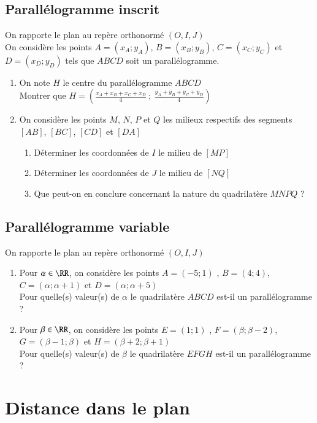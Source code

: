 \documentclass[oneside,12pt]{article}          %
\begin{document}
\subsection{Parallélogramme inscrit}
On rapporte le plan au repère orthonormé $(O,I,J)$\\
On considère les points $A=(x_A;y_A)$, $B=(x_B;y_B)$, $C=(x_C;y_C)$ et $D=(x_D;y_D)$ tels que $ABCD$ soit un parallélogramme.
\begin{enumerate}
	\item On note $H$ le centre du parallélogramme $ABCD$\\
	Montrer que $H=\left(\frac{x_A+x_B+x_C+x_D}{4}~;~\frac{y_A+y_B+y_C+y_D}{4}\right)$
	\item On considère les points $M$, $N$, $P$ et $Q$ les milieux respectifs des segments $[AB]$, $[BC]$, $[CD]$ et $[DA]$
	\begin{enumerate}
		\item Déterminer les coordonnées de $I$ le milieu de $[MP]$
		\item Déterminer les coordonnées de $J$ le milieu de $[NQ]$
		\item Que peut-on en conclure concernant la nature du quadrilatère $MNPQ$ ?
	\end{enumerate}
\end{enumerate}



\subsection{Parallélogramme variable}
On rapporte le plan au repère orthonormé $(O,I,J)$
\begin{enumerate}\setlength{\itemsep}{1pt}
	\item Pour $\alpha\in\RR$, on considère les points $A=(-5;1)$ , $B=(4;4)$, $C=(\alpha;\alpha+1)$ et $D=(\alpha;\alpha+5)$\\
Pour quelle(s) valeur(s) de $\alpha$ le quadrilatère $ABCD$ est-il un parallélogramme ?
	\item Pour $\beta\in\RR$, on considère les points $E=(1;1)$ , $F=(\beta;\beta-2)$, $G=(\beta-1;\beta)$ et $H=(\beta+2;\beta+1)$ \\
Pour quelle(s) valeur(s) de $\beta$ le quadrilatère $EFGH$ est-il un parallélogramme ?
\end{enumerate}






\section{Distance dans le plan}
\end{document}
